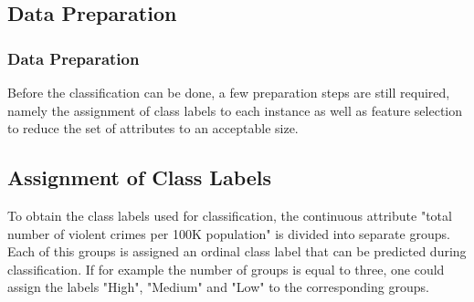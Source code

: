 \mode*

\begin{frame}
	\section{Data Preparation}
	\frametitle{Data Preparation}
\end{frame}


Before the classification can be done, a few preparation steps are still
required, namely the assignment of class labels to each instance as
well as feature selection to reduce the set of attributes to an
acceptable size.

\subsection{Assignment of Class Labels}
\label{sec:assignment}

To obtain the class labels used for classification, the
continuous attribute "total number of violent crimes per 100K
population" is divided into separate groups. Each of this groups is
assigned an ordinal class label that can be predicted during classification.
If for example the number of groups is equal to three, one could
assign the labels "High", "Medium" and "Low" to the corresponding
groups.

